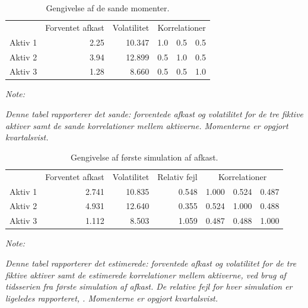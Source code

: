 \documentclass[
  a4paper,
  oneside]{memoir}
\begin{document}
\begin{table}[!h]

\caption{\label{tab:true}Gengivelse af de sande momenter.}
\centering
\begin{threeparttable}
\begin{tabular}[t]{lrrrrr}
\toprule
\multicolumn{1}{c}{ } & \multicolumn{1}{c}{Forventet afkast} & \multicolumn{1}{c}{Volatilitet} & \multicolumn{3}{c}{Korrelationer} \\
\cmidrule(l{3pt}r{3pt}){2-2} \cmidrule(l{3pt}r{3pt}){3-3} \cmidrule(l{3pt}r{3pt}){4-6}
\rowcolor{gray!6}  Aktiv 1 & 2.25 & 10.347 & 1.0 & 0.5 & 0.5\\
Aktiv 2 & 3.94 & 12.899 & 0.5 & 1.0 & 0.5\\
\rowcolor{gray!6}  Aktiv 3 & 1.28 & 8.660 & 0.5 & 0.5 & 1.0\\
\bottomrule
\end{tabular}
\begin{tablenotes}
\item \textit{Note: } 
\item \textit{Denne tabel rapporterer det sande: forventede afkast og volatilitet for de tre fiktive aktiver samt de sande korrelationer mellem aktiverne. Momenterne er opgjort kvartalsvist.}
\end{tablenotes}
\end{threeparttable}
\end{table}



\begin{table}[!h]

\caption{\label{tab:sim1}Gengivelse af første simulation af afkast.}
\centering
\begin{threeparttable}
\begin{tabular}[t]{lrrrrrr}
\toprule
\multicolumn{1}{c}{ } & \multicolumn{1}{c}{Forventet afkast} & \multicolumn{1}{c}{Volatilitet} & \multicolumn{1}{c}{Relativ fejl} & \multicolumn{3}{c}{Korrelationer} \\
\cmidrule(l{3pt}r{3pt}){2-2} \cmidrule(l{3pt}r{3pt}){3-3} \cmidrule(l{3pt}r{3pt}){4-4} \cmidrule(l{3pt}r{3pt}){5-7}
\rowcolor{gray!6}  Aktiv 1 & 2.741 & 10.835 & 0.548 & 1.000 & 0.524 & 0.487\\
Aktiv 2 & 4.931 & 12.640 & 0.355 & 0.524 & 1.000 & 0.488\\
\rowcolor{gray!6}  Aktiv 3 & 1.112 & 8.503 & 1.059 & 0.487 & 0.488 & 1.000\\
\bottomrule
\end{tabular}
\begin{tablenotes}
\item \textit{Note: } 
\item \textit{Denne tabel rapporterer det estimerede: forventede afkast og volatilitet for de tre fiktive aktiver samt de estimerede korrelationer mellem aktiverne, ved brug af tidsserien fra første simulation af afkast. De relative fejl for hver simulation er ligeledes rapporteret, \citep{Asmussen2007}. Momenterne er opgjort kvartalsvist.}
\end{tablenotes}
\end{threeparttable}
\end{table}
\end{document}
